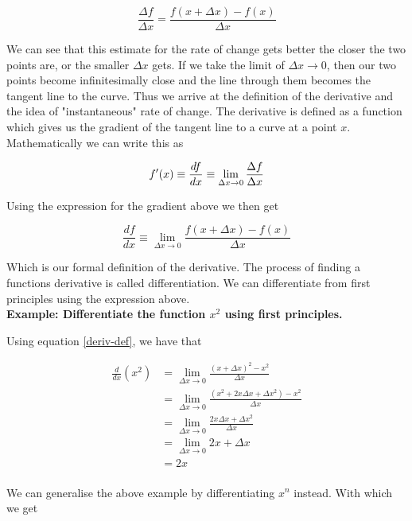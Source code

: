 \begin{equation} \label{gradient}
    \frac{\Delta f}{\Delta x} = \frac{f(x + \Delta x) - f(x)}{\Delta x}
\end{equation}

We can see that this estimate for the rate of change gets better the closer the two points are, or the smaller 
$\Delta x$ gets. If we take the limit of $\Delta x \to 0$, then our two points become infinitesimally close and the
line through them becomes the tangent line to the curve. Thus we arrive at the definition of the derivative and the
idea of "instantaneous" rate of change. The derivative is defined as a function which gives us the gradient of the 
tangent line to a curve at a point $x$. Mathematically we can write this as

\begin{equation*}
    f'(x) \equiv \frac{df}{dx} \equiv \lim_{\Delta x \to 0} \frac{\Delta f}{\Delta x}\\
\end{equation*}

Using the expression for the gradient above we then get

\begin{equation} \label{deriv-def}
    \frac{df}{dx} \equiv \lim_{\Delta x \to 0} \frac{f(x + \Delta x) - f(x)}{\Delta x}
\end{equation}

Which is our formal definition of the derivative. The process of finding a functions derivative is called 
differentiation. We can differentiate from first principles using the expression above.\\

\noindent\textbf{Example: Differentiate the function $x^2$ using first principles.}

Using equation \ref{deriv-def}, we have that

\begin{align*}
    \frac{d}{dx}(x^2) &= \lim_{\Delta x \to 0} \frac{(x + \Delta x)^2 - x^2}{\Delta x}\\
    &= \lim_{\Delta x \to 0} \frac{(x^2 + 2x\Delta x + \Delta x^2) - x^2}{\Delta x}\\
    &= \lim_{\Delta x \to 0} \frac{2x\Delta x + \Delta x^2}{\Delta x}\\
    &= \lim_{\Delta x \to 0} 2x + \Delta x\\
    &= 2x\\
\end{align*}

We can generalise the above example  by differentiating $x^n$ instead. With which we get

